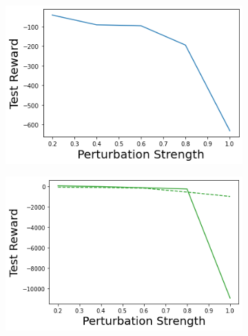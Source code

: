 \begin{figure}
\begin{subfigure}{.245\textwidth}
    \end{subfigure}
    \begin{subfigure}{.245\textwidth}
        \includegraphics[width=\textwidth]{sections/011_icml2022/resources/transition_shift-DKL-LunarLanderShift-v0-mean_reward_.png}
    \end{subfigure}
    \begin{subfigure}{.245\textwidth}
        \includegraphics[width=\textwidth]{sections/011_icml2022/resources/transition_shift-PostNet-LunarLanderShift-v0-mean_reward_.png}
    \end{subfigure}
    

\end{figure}
